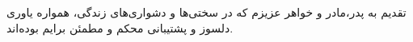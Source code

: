 \begin{acknowledgementpage}

\vspace{1.5cm}

{\nastaliq
{
تقدیم به پدر،مادر و خواهر عزیزم که در سختی‌ها و دشواری‌های زندگی، همواره یاوری دلسوز و پشتیبانی محکم و مطمئن برایم بوده‌اند.
 }}\end{acknowledgementpage}
\newpage